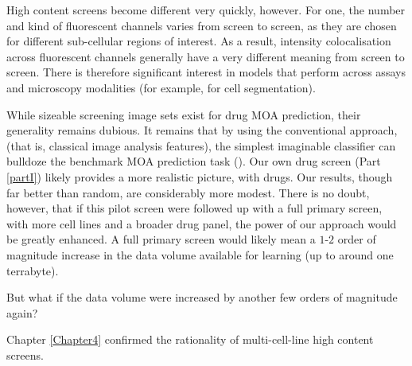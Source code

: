 High content screens become different very quickly, however. For one, the number and kind of fluorescent channels varies from screen to screen, as they are chosen for different sub-cellular regions of interest. As a result, intensity colocalisation across fluorescent channels generally have a very different meaning from screen to screen. There is therefore significant interest in models that perform across assays and microscopy modalities (for example, \cite{hollandi2019deep} for cell segmentation).

While sizeable screening image sets exist for drug MOA prediction, their generality remains dubious. It remains that by using the conventional approach, (that is, classical image analysis features), the simplest imaginable classifier can bulldoze the benchmark MOA prediction task (\cite{singh2014pipeline}). Our own drug screen (Part \ref{partI}) likely provides a more realistic picture, with drugs. Our results, though far better than random, are considerably more modest. There is no doubt, however, that if this pilot screen were followed up with a full primary screen, with more cell lines and a broader drug panel, the power of our approach would be greatly enhanced. A full primary screen would likely mean a $1$-$2$ order of magnitude increase in the data volume available for learning (up to around one terrabyte).

But what if the data volume were increased by another few orders of magnitude again?


Chapter \ref{Chapter4} confirmed the rationality of multi-cell-line high content screens.
